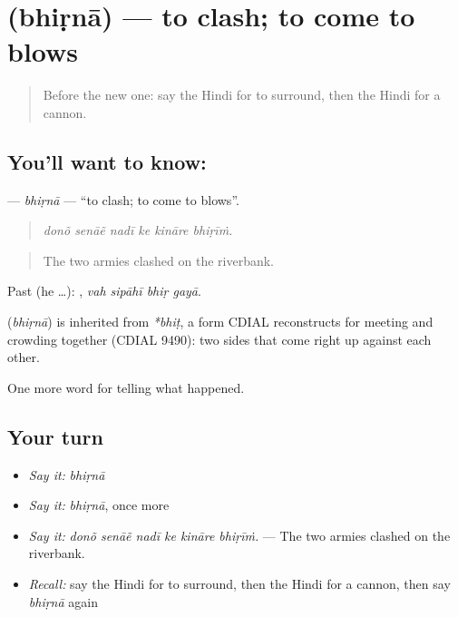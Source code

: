 \section[\texorpdfstring{\hi{भिड़ना} (bhiṛnā)}{भिड़ना (bhiṛnā)}]{ (bhiṛnā) — to clash; to come to blows}

\label{lesson:HI-C321-bhirna}



\begin{quote}
Before the new one: say the Hindi for to surround, then the Hindi for a cannon.
\end{quote}

\subsection*{You'll want to know: }
\textbf{} — \emph{bhiṛnā} — \textquotedblleft{}to clash; to come to blows\textquotedblright{}.

\begin{quote}
     
\end{quote}

\begin{quote}
\emph{donõ senāẽ nadī ke kināre bhiṛīṁ.}
\end{quote}

\begin{quote}
The two armies clashed on the riverbank.
\end{quote}

Past (he …):    , \emph{vah sipāhī bhiṛ gayā}.

\begin{cousinweb}
\textbf{} (\emph{bhiṛnā}) is inherited from \emph{*bhiṭ}, a form CDIAL reconstructs for meeting and crowding together (CDIAL 9490): two sides that \textbf{ } come right up against each other.
\end{cousinweb}

\begin{grammarlens}[title={What you've built}]
One more word for telling what happened.
\end{grammarlens}

\subsection*{Your turn}
\begin{itemize}
\raggedright
  \item \emph{Say it:} \emph{bhiṛnā}
  \item \emph{Say it:} \emph{bhiṛnā}, once more
  \item \emph{Say it:} \emph{donõ senāẽ nadī ke kināre bhiṛīṁ.} — The two armies clashed on the riverbank.
  \item \emph{Recall:} say the Hindi for to surround, then the Hindi for a cannon, then say \emph{bhiṛnā} again
\end{itemize}

